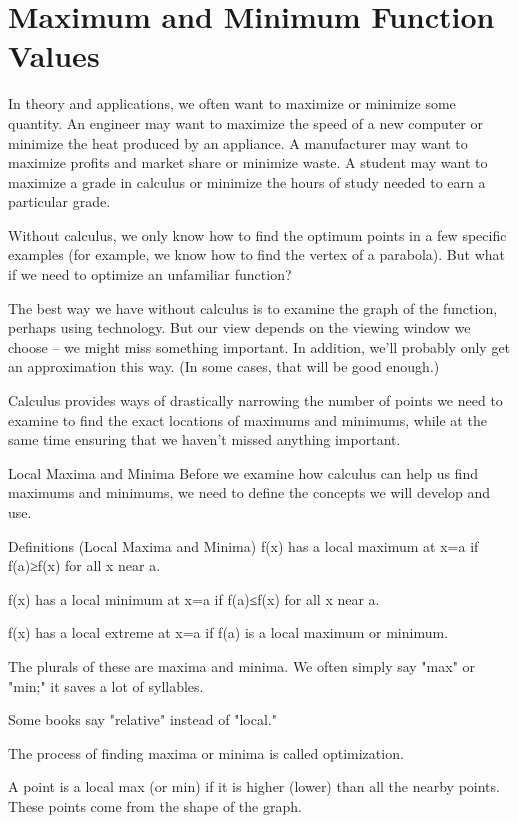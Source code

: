 \section{Maximum and Minimum Function Values}
\label{sec:optimization}

In theory and applications, we often want to maximize or minimize some quantity. An engineer may want to maximize the speed of a new computer or minimize the heat produced by an appliance. A manufacturer may want to maximize profits and market share or minimize waste. A student may want to maximize a grade in calculus or minimize the hours of study needed to earn a particular grade.

Without calculus, we only know how to find the optimum points in a few specific examples (for example, we know how to find the vertex of a parabola). But what if we need to optimize an unfamiliar function?

The best way we have without calculus is to examine the graph of the function, perhaps using technology. But our view depends on the viewing window we choose – we might miss something important. In addition, we’ll probably only get an approximation this way. (In some cases, that will be good enough.)

Calculus provides ways of drastically narrowing the number of points we need to examine to find the exact locations of maximums and minimums, while at the same time ensuring that we haven’t missed anything important.

Local Maxima and Minima
Before we examine how calculus can help us find maximums and minimums, we need to define the concepts we will develop and use.

Definitions (Local Maxima and Minima)
f(x) has a local maximum at x=a if f(a)≥f(x) for all x near a.

f(x) has a local minimum at x=a if f(a)≤f(x) for all x near a.

f(x) has a local extreme at x=a if f(a) is a local maximum or minimum.

The plurals of these are maxima and minima. We often simply say "max" or "min;" it saves a lot of syllables.

Some books say "relative" instead of "local."

The process of finding maxima or minima is called optimization.

A point is a local max (or min) if it is higher (lower) than all the nearby points. These points come from the shape of the graph.


